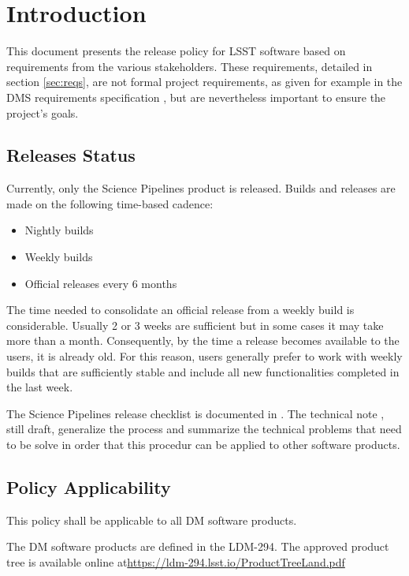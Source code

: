 \section{Introduction} \label{sec:intro}

This document presents the release policy for \gls{LSST} software based on requirements from the various stakeholders.
These requirements, detailed in section \ref{sec:reqs}, are not formal project requirements, as given for example in the \gls{DMS} requirements specification , but are nevertheless important to ensure the project's goals.


\subsection{Releases Status}\label{sec:sci}

Currently, only the \gls{Science Pipelines} product is released. 
Builds and releases are made on the following time-based cadence:

\begin{itemize}
\item Nightly builds
\item Weekly builds
\item Official releases every 6 months
\end{itemize}

The time needed to consolidate an official release from a weekly build is considerable.
Usually 2 or 3 weeks are sufficient but in some cases it may take more than a month. 
Consequently, by the time a release becomes available to the users, it is already old.
For this reason, users generally prefer to work with weekly builds that are sufficiently stable and include all new functionalities completed in the last week.

The \gls{Science Pipelines} release checklist is documented in .
The technical note , still draft, generalize the process and summarize the technical problems that need to be solve in order that this procedur can be applied to other software products.


\subsection{Policy Applicability} \label{sec:applicability}

This policy shall be applicable to all \gls{DM} software products.

The \gls{DM} software products are defined in the LDM-294. 
The approved product tree is available online at\url{https://ldm-294.lsst.io/ProductTreeLand.pdf}

